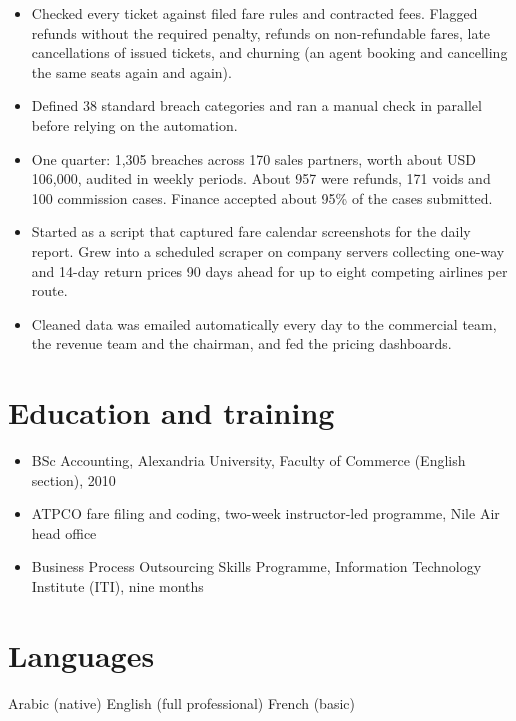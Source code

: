 \begin{itemize}
  \item Checked every ticket against filed fare rules and contracted fees. Flagged refunds without the required penalty, refunds on non-refundable fares, late cancellations of issued tickets, and churning (an agent booking and cancelling the same seats again and again).
  \item Defined 38 standard breach categories and ran a manual check in parallel before relying on the automation.
  \item One quarter: 1,305 breaches across 170 sales partners, worth about USD 106,000, audited in weekly periods. About 957 were refunds, 171 voids and 100 commission cases. Finance accepted about 95\% of the cases submitted.
\end{itemize}

\begin{itemize}
  \item Started as a script that captured fare calendar screenshots for the daily report. Grew into a scheduled scraper on company servers collecting one-way and 14-day return prices 90 days ahead for up to eight competing airlines per route.
  \item Cleaned data was emailed automatically every day to the commercial team, the revenue team and the chairman, and fed the pricing dashboards.
\end{itemize}

\section{Education and training}
\begin{itemize}
  \item BSc Accounting, Alexandria University, Faculty of Commerce (English section), 2010
  \item ATPCO fare filing and coding, two-week instructor-led programme, Nile Air head office
  \item Business Process Outsourcing Skills Programme, Information Technology Institute (ITI), nine months
\end{itemize}

\section{Languages}
Arabic (native) \textperiodcentered{} English (full professional) \textperiodcentered{} French (basic)\par


